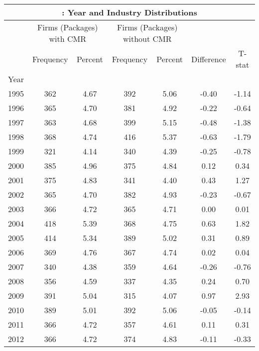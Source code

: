 \begin{tabular}{lcccccc} \toprule
	\multicolumn{7}{c}{\small \centering {Panel A}: Year and Industry Distributions} \\ \midrule 
	& \multicolumn{2}{c}{Firms (Packages) with CMR} & \multicolumn{2}{c}{Firms (Packages) without CMR} & & \\ 
	& Frequency & Percent & Frequency & Percent & Difference & T-stat \\
	\cmidrule(lr){2-3}\cmidrule(lr){4-5}\cmidrule(lr){6-7}
	{Year}& & & & & & \\
	1995 & 362  &   4.67  &    392  &   5.06  &  -0.40  &     -1.14 \\ 
	1996 & 365  &   4.70  &    381  &   4.92  &  -0.22  &     -0.64 \\ 
	1997 & 363  &   4.68  &    399  &   5.15  &  -0.48  &     -1.38 \\ 
	1998 & 368  &   4.74  &    416  &   5.37  &  -0.63  &     -1.79 \\ 
	1999 & 321  &   4.14  &    340  &   4.39  &  -0.25  &     -0.78 \\ 
	2000 & 385  &   4.96  &    375  &   4.84  &   0.12  &      0.34 \\ 
	2001 & 375  &   4.83  &    341  &   4.40  &   0.43  &      1.27 \\ 
	2002 & 365  &   4.70  &    382  &   4.93  &  -0.23  &     -0.67 \\ 
	2003 & 366  &   4.72  &    365  &   4.71  &   0.00  &      0.01 \\ 
	2004 & 418  &   5.39  &    368  &   4.75  &   0.63  &      1.82 \\ 
	2005 & 414  &   5.34  &    389  &   5.02  &   0.31  &      0.89 \\ 
	2006 & 369  &   4.76  &    367  &   4.74  &   0.02  &      0.04 \\ 
	2007 & 340  &   4.38  &    359  &   4.64  &  -0.26  &     -0.76 \\ 
	2008 & 356  &   4.59  &    337  &   4.35  &   0.24  &      0.70 \\ 
	2009 & 391  &   5.04  &    315  &   4.07  &   0.97  &      2.93 \\ 
	2010 & 389  &   5.01  &    392  &   5.06  &  -0.05  &     -0.14 \\ 
	2011 & 366  &   4.72  &    357  &   4.61  &   0.11  &      0.31 \\ 
	2012 & 366  &   4.72  &    374  &   4.83  &  -0.11  &     -0.33 \\ 

\end{tabular}
